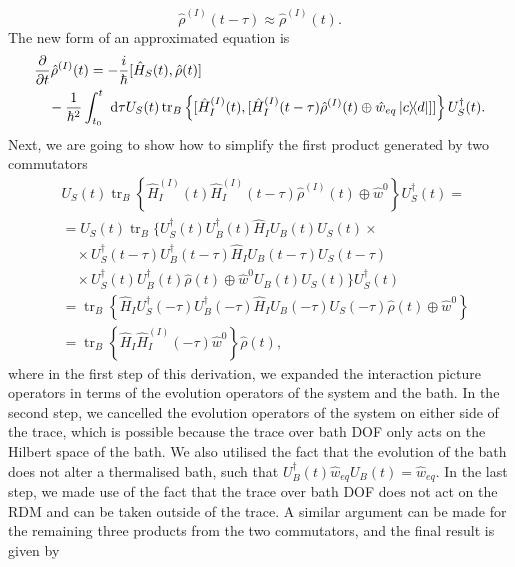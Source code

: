 \begin{equation}
    \hat{\rho}^{(I)}(t-\tau) \approx \hat{\rho}^{(I)}(t).
\end{equation}
The new form of an approximated equation is 
\begin{equation}
\label{QME_RDM_Redfield_3}
\begin{aligned}
    &\frac{\partial}{\partial t}\hat{\rho}^{(I)}(t) = -\frac{i}{\hbar} [ \hat{H}_S(t), \hat{\rho}(t) ] \\
    &\quad -\frac{1}{\hbar^2} \int_{t_0}^{t} \mathrm{~d} \tau U_{S}(t) \operatorname{tr}_B \left\{[ \hat{H}_I^{(I)}(t), [ \hat{H}_I^{(I)}(t-\tau) \hat{\rho}^{(I)}(t) \oplus \hat{w}_{eq} \ketbra{c}{d}] ] \right\} U_{S}^\dagger(t).
    \end{aligned}
\end{equation}
Next, we are going to show how to simplify the first product generated by two commutators
\begin{equation}
    \begin{aligned}
    &U_{S}(t) \operatorname{tr}_B \left\{ \hat{H}_I^{(I)}(t) \hat{H}_I^{(I)}(t-\tau)  \hat{\rho}^{(I)}(t) \oplus \hat{w}^{0} \right\} U_{S}^\dagger(t) =\\
    &= U_{S}(t) \operatorname{tr}_B \Big\{ U_{S}^\dagger(t) U_{B}^\dagger(t) \hat{H}_I U_{B}(t) U_{S}(t) \times \\
    &\quad \times U_{S}^\dagger(t-\tau) U_{B}^\dagger(t-\tau)  \hat{H}_I U_{B}(t-\tau) U_{S}(t-\tau) \\
    &\quad \times U_{S}^\dagger(t) U_{B}^\dagger(t) \hat{\rho}(t)\oplus \hat{w}^{0} U_{B}(t) U_{S}(t) \Big\} U_{S}^\dagger(t) \\
    & = \operatorname{tr}_B \left\{ \hat{H}_I U_{S}^\dagger(-\tau) U_{B}^\dagger(-\tau)  \hat{H}_I U_{B}(-\tau) U_{S}(-\tau)  \hat{\rho}(t) \oplus \hat{w}^{0} \right\} \\
    & = \operatorname{tr}_B \left\{ \hat{H}_I \hat{H}_I^{(I)}(-\tau) \hat{w}^{0} \right\}  \hat{\rho}(t),
    \end{aligned}
\end{equation}
where in the first step of this derivation, we expanded the interaction picture operators in terms of the evolution operators of the system and the bath. In the second step, we cancelled the evolution operators of the system on either side of the trace, which is possible because the trace over bath DOF only acts on the Hilbert space of the bath. We also utilised the fact that the evolution of the bath does not alter a thermalised bath, such that $U_{B}^\dagger(t) \hat{w}_{eq} U_{B}(t) = \hat{w}_{eq}$. In the last step, we made use of the fact that the trace over bath DOF does not act on the RDM and can be taken outside of the trace. A similar argument can be made for the remaining three products from the two commutators, and the final result is given by

